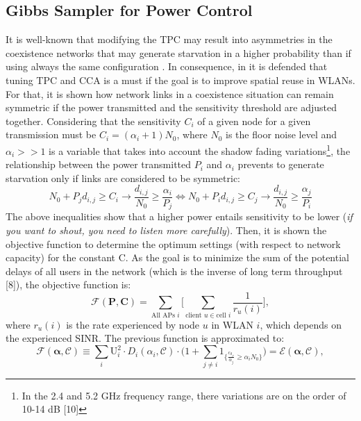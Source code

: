 \documentclass[12pt, a4paper,twoside]{tesi_upf}
\begin{document}
			\subsection{Gibbs Sampler for Power Control}
			\label{section:gibbs_sampler_power_control}		
			It is well-known that modifying the TPC may result into asymmetries in the coexistence networks that may generate starvation in a higher probability than if using always the same configuration \cite{kawadia2005principles}. In consequence, in \cite{mhatre2007interference} it is defended that tuning TPC and CCA is a must if the goal is to improve spatial reuse in WLANs. For that, it is 
			shown how network links in a coexistence situation can remain symmetric if the power transmitted and the sensitivity threshold are adjusted together. Considering that the sensitivity $C_i$ of a given node for a given transmission must be $C_i =(\alpha_i + 1)N_0$, where $N_0$ is the floor noise level and $\alpha_i >>1$ is a variable that takes into account the shadow fading variations\footnote{In the 2.4 and 5.2 GHz frequency range, there variations are on the order of 10-14 dB [10]}, the relationship between the power transmitted $P_i$ and $\alpha_i$ prevents to generate starvation only if links are considered to be symmetric:
			\begin{equation}
			N_0 + P_j d_{i,j} \geq C_i \rightarrow \frac{d_{i,j}}{N_0} \geq \frac{\alpha_i}{P_j} \iff 
			N_0 + P_i d_{i,j} \geq C_j \rightarrow \frac{d_{i,j}}{N_0} \geq \frac{\alpha_j}{P_i}
			\end{equation}	
			The above inequalities show that a higher power entails sensitivity to be lower (\textit{if you want to shout, you need to listen more carefully}). Then, it is shown the objective function to determine the optimum settings (with respect to network capacity) for the constant C. As the goal is to minimize the sum of the potential delays of all users in the network (which is the inverse of long term throughput [8]), the objective function is:
			\begin{equation}
			\mathcal{F}(\boldsymbol{P,C})=\sum_{\text{All APs } i}  \bigg[ \sum_{\text{client } u \in \text{cell } i} \frac{1}{r_u(i)} \bigg],
			\end{equation}
			where $r_u(i)$ is the rate experienced by node $u$ in WLAN $i$, which depends on the experienced SINR. The previous function is approximated to:	
			\begin{equation}
			\mathcal{F}(\boldsymbol{\alpha},\mathcal{C})\equiv \sum_{i}  \text{U}_i^2 \cdot D_i(\alpha_i, \mathcal{C}) \cdot \bigg( 1 + \sum_{j\neq i}  1_{\Big\{ \frac{c_{d_{ji}}}{\alpha_j}  \geq \alpha_i N_0 \Big\}} \bigg) = \mathcal{E}(\boldsymbol{\alpha},\mathcal{C}),
			\end{equation}
\end{document}
